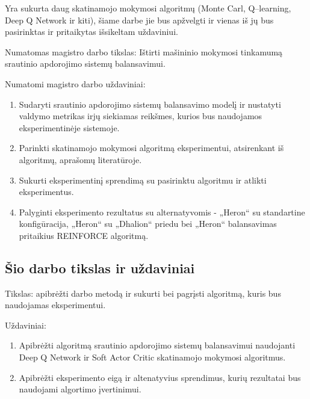 \documentclass{VUMIFPSbakalaurinis}
\begin{document}
Yra sukurta daug skatinamojo mokymosi algoritmų (Monte Carl, Q–learning, Deep Q Network ir kiti), šiame darbe jie bus apžvelgti ir vienas iš jų bus pasirinktas ir pritaikytas išsikeltam uždaviniui. 

Numatomas magistro darbo tikslas: Ištirti mašininio mokymosi tinkamumą srautinio apdorojimo sistemų balansavimui. 

Numatomi magistro darbo uždaviniai:
\begin{enumerate}
    \item Sudaryti srautinio apdorojimo sistemų balansavimo modelį ir nustatyti valdymo metrikas irjų siekiamas reikšmes, kurios bus naudojamos eksperimentinėje sistemoje.
    \item Parinkti skatinamojo mokymosi algoritmą eksperimentui, atsirenkant iš algoritmų, aprašomų literatūroje.
    \item Sukurti eksperimentinį sprendimą su pasirinktu algoritmu ir atlikti eksperimentus.
    \item Palyginti eksperimento rezultatus su alternatyvomis - „Heron“ su standartine konfigūracija, „Heron“ su „Dhalion“ priedu bei „Heron“ balansavimas pritaikius REINFORCE algoritmą. 
\end{enumerate}


\subsection*{Šio darbo tikslas ir uždaviniai}
Tikslas: apibrėžti darbo metodą ir sukurti bei pagrįsti algoritmą, kuris bus naudojamas eksperimentui.

Uždaviniai:
\begin{enumerate}
    \item Apibrėžti algoritmą srautinio apdorojimo sistemų balansavimui naudojanti Deep Q Network ir Soft Actor Critic skatinamojo mokymosi algoritmus.
    \item Apibrėžti eksperimento eigą ir altenatyvius sprendimus, kurių rezultatai bus naudojami algortimo įvertinimui. 
\end{enumerate}
\end{document}

